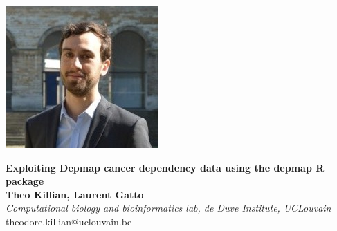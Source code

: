 \documentclass{article}
\title{}
\author{}
\date{}
\begin{document}


\begin{center}
\colorbox{lgray}{
  \begin{minipage}{3cm}
    \includegraphics[width=1.2\linewidth]{figs/theo_killian_crop.jpg}
  \end{minipage}
  \begin{minipage}{.74\textwidth}
    \begin{center}
      \huge \textbf{Exploiting Depmap cancer dependency data using the depmap R package} \\
      \vspace{0.4cm}
      \Large \textbf{Theo Killian, Laurent Gatto} \\
      \Large \textit{Computational biology and bioinformatics lab, de Duve Institute, UCLouvain } \\
      \vspace{0.4cm}
      \normalsize theodore.killian@uclouvain.be \\
    \end{center}
  \end{minipage}
  \begin{minipage}{3.7cm}

\end{minipage}}
\end{center}
\end{document}
